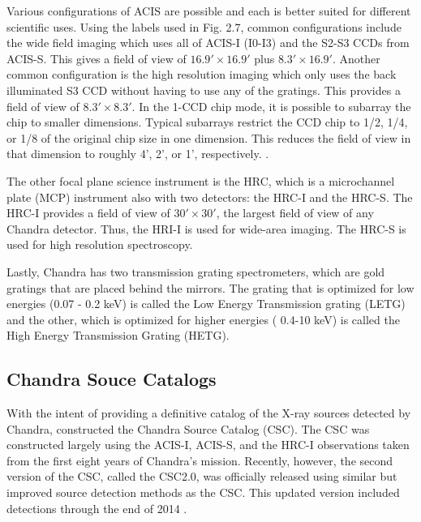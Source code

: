 Various configurations of ACIS are possible and each is better suited for different scientific uses. 
Using the labels used in Fig. 2.7, common configurations include the wide field imaging which uses all of ACIS-I (I0-I3) and the S2-S3 CCDs from ACIS-S.
This gives a field of view of $16.9' \times 16.9'$ plus $8.3' \times 16.9'$.
Another common configuration is the high resolution imaging which only uses the back illuminated S3 CCD without having to use any of the gratings. 
This provides a field of view of $8.3' \times 8.3'$.
In the 1-CCD chip mode, it is possible to subarray the chip to smaller dimensions. 
Typical subarrays restrict the CCD chip to 1/2, 1/4, or 1/8 of the original chip size in one dimension.
This reduces the field of view in that dimension to roughly 4', 2', or 1', respectively.
\citep{weisskopf2002}.

The other focal plane science instrument is the HRC, which is a microchannel plate (MCP) instrument also with two detectors: the HRC-I and the HRC-S. 
The HRC-I provides a field of view of $30' \times 30'$, the largest field of view of any Chandra detector. 
Thus, the HRI-I is used for wide-area imaging. The HRC-S is used for high resolution spectroscopy.

Lastly, Chandra has two transmission grating spectrometers, which are gold gratings that are placed behind the mirrors. 
The grating that is optimized for low energies  (0.07 - 0.2 keV) is called the Low Energy Transmission grating (LETG) and the other, which is optimized for higher energies ( 0.4-10 keV) is called the High Energy Transmission Grating (HETG).

\subsection{Chandra Souce Catalogs}

With the intent of providing a definitive catalog of the X-ray sources detected by Chandra, \cite{evans2010} constructed the Chandra Source Catalog (CSC).
The CSC was constructed largely using the ACIS-I, ACIS-S, and the HRC-I observations taken from the first eight years of Chandra’s mission. 
Recently, however, the second version of the CSC, called the CSC2.0, was officially released using similar but improved source detection methods as the CSC. 
This updated version included detections through the end of 2014 \citep{Evans2020}.

